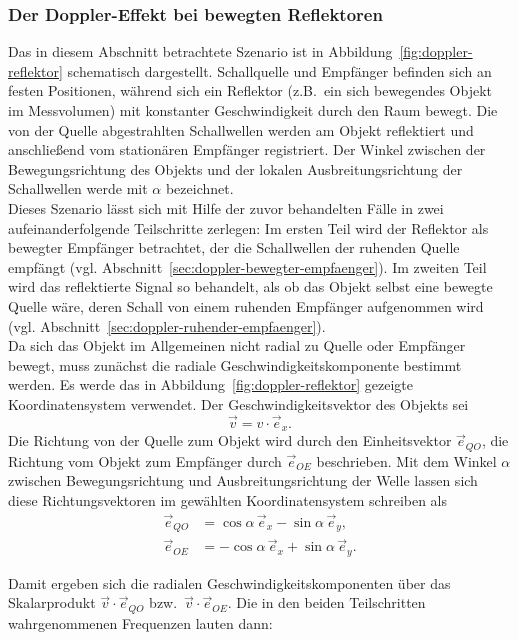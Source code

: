 \documentclass[
	german,%
	accentcolor=3d,%
	type=intern, %
	marginpar=false,%
]{tudapub}
\begin{document}
   \subsubsection{Der Doppler-Effekt bei bewegten Reflektoren}\label{sec:doppler-bewegter-reflektor}

      Das in diesem Abschnitt betrachtete Szenario ist in Abbildung~\ref{fig:doppler-reflektor} schematisch dargestellt. Schallquelle und Empfänger befinden sich an festen Positionen, während sich ein Reflektor (z.B.\ ein sich bewegendes Objekt im Messvolumen) mit konstanter Geschwindigkeit durch den Raum bewegt. Die von der Quelle abgestrahlten Schallwellen werden am Objekt reflektiert und anschließend vom stationären Empfänger registriert. Der Winkel zwischen der Bewegungsrichtung des Objekts und der lokalen Ausbreitungsrichtung der Schallwellen werde mit \(\alpha\) bezeichnet.
      \\
      Dieses Szenario lässt sich mit Hilfe der zuvor behandelten Fälle in zwei aufeinanderfolgende Teilschritte zerlegen: Im ersten Teil wird der Reflektor als bewegter Empfänger betrachtet, der die Schallwellen der ruhenden Quelle empfängt (vgl. Abschnitt~\ref{sec:doppler-bewegter-empfaenger}).  Im zweiten Teil wird das reflektierte Signal so behandelt, als ob das Objekt selbst eine bewegte Quelle wäre, deren Schall von einem ruhenden Empfänger aufgenommen wird (vgl. Abschnitt~\ref{sec:doppler-ruhender-empfaenger}).
      \\
      Da sich das Objekt im Allgemeinen nicht radial zu Quelle oder Empfänger bewegt, muss zunächst die radiale Geschwindigkeitskomponente bestimmt werden. Es werde das in Abbildung~\ref{fig:doppler-reflektor} gezeigte Koordinatensystem verwendet. Der Geschwindigkeitsvektor des Objekts sei
      \[
         \vec{v} = v \cdot \vec{e}_x .
      \]
      Die Richtung von der Quelle zum Objekt wird durch den Einheitsvektor \(\vec{e}_{QO}\), die Richtung vom Objekt zum Empfänger durch \(\vec{e}_{OE}\) beschrieben. Mit dem Winkel \(\alpha\) zwischen Bewegungsrichtung und Ausbreitungsrichtung der Welle lassen sich diese Richtungsvektoren im gewählten Koordinatensystem schreiben als
      \begin{align}
         \vec{e}_{QO} &= \cos\alpha\,\vec{e}_x - \sin\alpha\,\vec{e}_y , \label{eq:e_QO}\\
         \vec{e}_{OE} &= -\cos\alpha\,\vec{e}_x + \sin\alpha\,\vec{e}_y . \label{eq:e_OE}
      \end{align}

      Damit ergeben sich die radialen Geschwindigkeitskomponenten über das Skalarprodukt \(\vec{v}\cdot\vec{e}_{QO}\) bzw.\ \(\vec{v}\cdot\vec{e}_{OE}\). Die in den beiden Teilschritten wahrgenommenen Frequenzen lauten dann:
\end{document}
